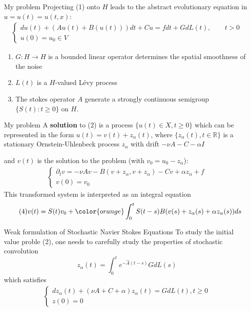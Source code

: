 \documentclass[xcolor=dvipsnames,leqno]{beamer}
\newcommand{\R}{\mathbb{R}}
\begin{document}
\begin{frame}{My problem}  
Projecting (1) onto $H$ leads to the abstract evolutionary equation in $u=u(t)=u(t,x)$:
	\begin{align*}\tag{2}%
			\begin{cases}
		        du(t)+(Au(t)+B(u(t)))dt+Cu=fdt+GdL(t), \qquad t>0\\
				u(0)=u_0\in V%
			\end{cases}
	\end{align*}  
\begin{enumerate}
	\item $G: H\to H$ is a bounded linear operator determines the spatial smoothness of the noise
	\item $L(t)$ is a $H$-valued L\'evy process
	\item The stokes operator $A$ generate a strongly continuous semigroup $\{S(t): t\geq 0\}$ on $H$.
\end{enumerate}
\end{frame} 

\begin{frame}{My problem}
	A \textbf{solution} to (2) is a process $\{u(t)\in X,t\geq 0\}$ which can be represented in the form $u(t) = v(t) +z_{\alpha}(t)$, where $\{z_{\alpha}(t), t\in\R\}$ is a stationary Ornstein-Uhlenbeck process $z_{\alpha}$ with drift $-\nu A-C-\alpha I$
	
and $v(t)$ is the solution to the problem (with $v_0 = u_0-z_{\alpha}$):
	\begin{align*}\tag{3}
		\begin{cases}
			\partial_t v = -\nu Av- B(v+z_{\alpha},v+z_{\alpha}) - Cv +\alpha z_{\alpha} +f \\
			v(0)=v_0
		\end{cases}
	\end{align*}
This transformed system is interpreted as an integral equation
\begin{align*}\tag{4}
	v(t)&=S(t)v_0+{\color{orange}\int_{0}^{t}S(t-s)B(v(s)+z_{\alpha}(s)+\alpha z_{\alpha}(s))ds}
\end{align*}
\end{frame}

\begin{frame}{Weak formulation of Stochastic Navier Stokes Equations}
To study the initial value proble (2), one needs to carefully study the properties of stochastic convolution $$z_{\alpha}(t)=\int^t_0 e^{-\hat{A}(t-s)} GdL(s)$$ which satisfies
	\begin{align*}\tag{3}
		\begin{cases}
			dz_{\alpha}(t)+(\nu A + C+\alpha)z_{\alpha}(t)=GdL(t), t\geq 0\\
			z(0)=0
		\end{cases}
	\end{align*}
\end{frame}              
\end{document}
